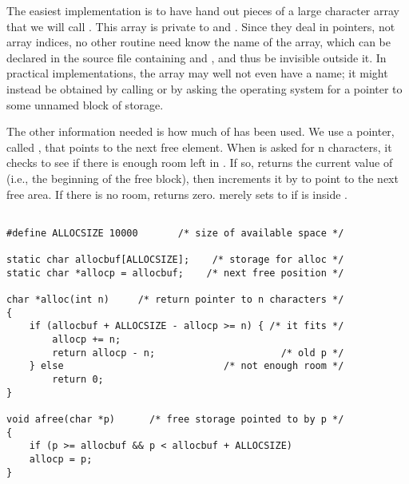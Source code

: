 The easiest implementation is to have  hand out pieces of a large character array that we will call . This array is private to  and .
Since they deal in pointers, not array indices, no other routine need know the name of the array, which can be declared  in the source file containing  and , and thus be invisible outside it.
In practical implementations, the array may well not even have a name; it might instead be obtained by calling  or by asking the operating system for a pointer to some unnamed block of storage.

The other information needed is how much of  has been used.
We use a pointer, called , that points to the next free element.
When  is asked for n characters, it checks to see if there is enough room left in .
If so,  returns the current value of  (i.e., the beginning of the free block), then increments it by  to point to the next free area.
If there is no room,  returns zero.  merely sets  to  if  is inside .

\begin{lstlisting}[frameround=tttt,frame=none]

#define ALLOCSIZE 10000       /* size of available space */

static char allocbuf[ALLOCSIZE];    /* storage for alloc */
static char *allocp = allocbuf;    /* next free position */

char *alloc(int n)     /* return pointer to n characters */
{
    if (allocbuf + ALLOCSIZE - allocp >= n) { /* it fits */
        allocp += n;
        return allocp - n;                      /* old p */
    } else                            /* not enough room */
        return 0;
}

void afree(char *p)      /* free storage pointed to by p */
{
    if (p >= allocbuf && p < allocbuf + ALLOCSIZE)
    allocp = p;
}

\end{lstlisting}

